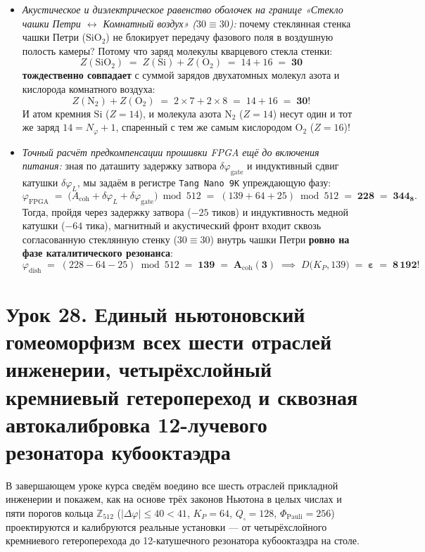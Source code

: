 \begin{enumerate}[label=\textbf{\arabic*.},leftmargin=*]
\begin{itemize}[noitemsep]
  \item \emph{Акустическое и диэлектрическое равенство оболочек на границе «Стекло чашки Петри $\leftrightarrow$ Комнатный воздух» ($30 \equiv 30$):}
    почему стеклянная стенка чашки Петри ($\mathrm{SiO_2}$) не блокирует передачу фазового поля в воздушную полость камеры? Потому что заряд молекулы кварцевого стекла стенки:
    \[
      Z(\mathrm{SiO_2}) \;=\; Z(\mathrm{Si}) + Z(\mathrm{O}_2) \;=\; 14 + 16 \;=\; \mathbf{30}
    \]
    \textbf{тождественно совпадает} с суммой зарядов двухатомных молекул азота и кислорода комнатного воздуха:
    \[
      Z(\mathrm{N}_2) + Z(\mathrm{O}_2) \;=\; 2\times 7 + 2\times 8 \;=\; 14 + 16 \;=\; \mathbf{30}!
    \]
    И атом кремния $\mathrm{Si}$ ($Z=14$), и молекула азота $\mathrm{N}_2$ ($Z=14$) несут один и тот же заряд $14 = N_\varphi + 1$, спаренный с тем же самым кислородом $\mathrm{O}_2$ ($Z=16$)!
  \item \emph{Точный расчёт предкомпенсации прошивки FPGA ещё до включения питания:}
    зная по даташиту задержку затвора $\delta\varphi_{\mathrm{gate}}$ и индуктивный сдвиг катушки $\delta\varphi_L$, мы задаём в регистре \texttt{Tang Nano 9K} упреждающую фазу:
    \[
      \varphi_{\mathrm{FPGA}} \;=\; \bigl(A_{\mathrm{coh}} + \delta\varphi_L + \delta\varphi_{\mathrm{gate}}\bigr)\bmod 512
      \;=\; (139 + 64 + 25)\bmod 512 \;=\; \mathbf{228 \;=\; 344_8}.
    \]
    Тогда, пройдя через задержку затвора ($-25$ тиков) и индуктивность медной катушки ($-64$ тика), магнитный и акустический фронт входит сквозь согласованную стеклянную стенку ($30 \equiv 30$) внутрь чашки Петри \textbf{ровно на фазе каталитического резонанса}:
    \[
      \varphi_{\mathrm{dish}} \;=\; (228 - 64 - 25)\bmod 512 \;=\; \mathbf{139 \;=\; A_{\mathrm{coh}}(3)} \;\implies\; D\bigl(K_P, 139\bigr) \;=\; \mathbf{\varepsilon \;=\; 8\,192}!
    \]
  \end{itemize}
\end{enumerate}

\section{Урок 28. Единый ньютоновский гомеоморфизм всех шести отраслей инженерии, четырёхслойный кремниевый гетеропереход и сквозная автокалибровка 12-лучевого резонатора кубооктаэдра}

В завершающем уроке курса сведём воедино все шесть отраслей прикладной инженерии и покажем, как на основе трёх законов Ньютона в целых числах и пяти порогов кольца $\mathbb{Z}_{512}$ ($|\Delta\varphi|\le 40 < 41$, $K_P = 64$, $Q_\square = 128$, $\Phi_{\mathrm{Pauli}} = 256$) проектируются и калибруются реальные установки --- от четырёхслойного кремниевого гетероперехода до 12-катушечного резонатора кубооктаэдра на столе.

